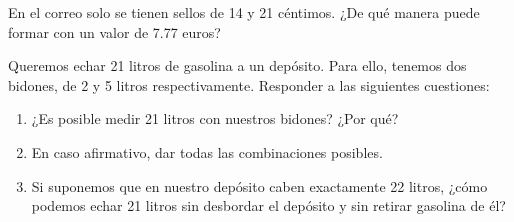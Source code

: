 \begin{problem}
    En el correo solo se tienen sellos de 14 y 21 céntimos.
    ¿De qué manera puede formar con un valor de 7.77 euros?
\end{problem}

\begin{problem}
    Queremos echar 21 litros de gasolina a un depósito.
    Para ello, tenemos dos bidones, de 2 y 5 litros respectivamente.
    Responder a las siguientes cuestiones:
    \begin{enumerate}
        \item ¿Es posible medir 21 litros con nuestros bidones? ¿Por qué?
        \item En caso afirmativo, dar todas las combinaciones posibles.
        \item Si suponemos que en nuestro depósito caben exactamente 22 litros, ¿cómo podemos echar 21 litros sin desbordar el depósito y sin retirar gasolina de él?
    \end{enumerate}
\end{problem}
